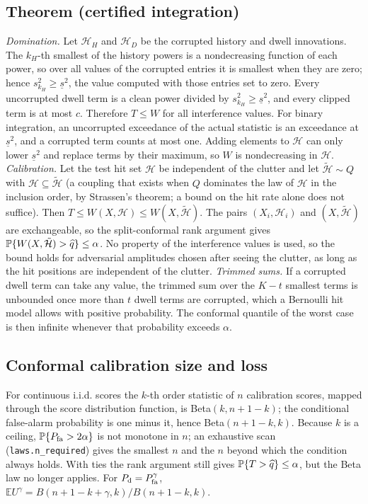 \subsection{Theorem (certified integration)}
\emph{Domination.} Let $\mathcal H_H$ and $\mathcal H_D$ be the corrupted history and dwell innovations. The $k_H$-th smallest of the history powers is a nondecreasing function of each power, so over all values of the corrupted entries it is smallest when they are zero; hence $s_{k_H}^2\ge\underline s^2$, the value computed with those entries set to zero. Every uncorrupted dwell term is a clean power divided by $s_{k_H}^2\ge\underline s^2$, and every clipped term is at most $c$. Therefore $T\le W$ for all interference values. For binary integration, an uncorrupted exceedance of the actual statistic is an exceedance at $\underline s^2$, and a corrupted term counts at most one. Adding elements to $\mathcal H$ can only lower $\underline s^2$ and replace terms by their maximum, so $W$ is nondecreasing in $\mathcal H$.
\emph{Calibration.} Let the test hit set $\mathcal H$ be independent of the clutter and let $\tilde{\mathcal H}\sim Q$ with $\mathcal H\subseteq\tilde{\mathcal H}$ (a coupling that exists when $Q$ dominates the law of $\mathcal H$ in the inclusion order, by Strassen's theorem; a bound on the hit rate alone does not suffice). Then $T\le W(X,\mathcal H)\le W(X,\tilde{\mathcal H})$. The pairs $(X_i,\mathcal H_i)$ and $(X,\tilde{\mathcal H})$ are exchangeable, so the split-conformal rank argument gives $\mathbb{P}\{W(X,\tilde{\mathcal H})>\widehat q\}\le\alpha$. No property of the interference values is used, so the bound holds for adversarial amplitudes chosen after seeing the clutter, as long as the hit positions are independent of the clutter.
\emph{Trimmed sums.} If a corrupted dwell term can take any value, the trimmed sum over the $K-t$ smallest terms is unbounded once more than $t$ dwell terms are corrupted, which a Bernoulli hit model allows with positive probability. The conformal quantile of the worst case is then infinite whenever that probability exceeds $\alpha$.

\subsection{Conformal calibration size and loss}
For continuous i.i.d. scores the $k$-th order statistic of $n$ calibration scores, mapped through the score distribution function, is Beta$(k,n+1-k)$; the conditional false-alarm probability is one minus it, hence Beta$(n+1-k,k)$. Because $k$ is a ceiling, $\mathbb{P}\{P_{\rm fa}>2\alpha\}$ is not monotone in $n$; an exhaustive scan (\texttt{laws.n\_required}) gives the smallest $n$ and the $n$ beyond which the condition always holds. With ties the rank argument still gives $\mathbb{P}\{T>\widehat q\}\le\alpha$, but the Beta law no longer applies. For $P_{\rm d}=P_{\rm fa}^{\gamma}$, $\mathbb EU^\gamma=B(n+1-k+\gamma,k)/B(n+1-k,k)$.
